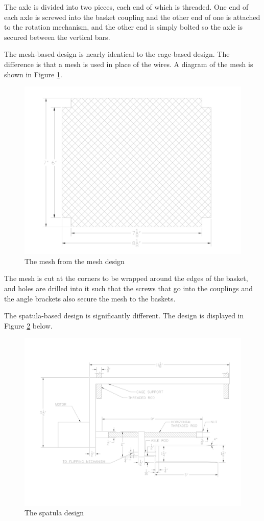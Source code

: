 \documentclass[11pt]{article}
\begin{document}
The axle is divided into two pieces, each end of which is threaded.
One end of each axle is screwed into the basket coupling and the other end of one is attached to the rotation mechanism, and the other end is simply bolted so the axle is secured between the vertical bars.

The mesh-based design is nearly identical to the cage-based design.
The difference is that a mesh is used in place of the wires.
A diagram of the mesh is shown in Figure \ref{fig:mesh}.

\begin{figure}[H]
  \centering
  \includegraphics[width=0.6\linewidth]{res/mesh.png}
  \caption{The mesh from the mesh design}
  \label{fig:mesh}
\end{figure}

The mesh is cut at the corners to be wrapped around the edges of the basket, and holes are drilled into it such that the screws that go into the couplings and the angle brackets also secure the mesh to the baskets.

The spatula-based design is significantly different.
The design is displayed in Figure \ref{fig:spatula} below.

\begin{figure}[H]
  \centering
  \includegraphics[width=0.6\linewidth]{res/spatula.png}
  \caption{The spatula design}
  \label{fig:spatula}
\end{figure}
\end{document}
